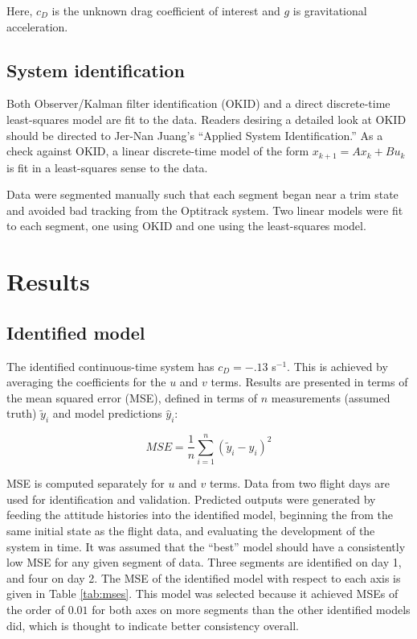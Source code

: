 \documentclass{aiaa-tc}
\begin{document}
Here, $c_D$ is the unknown drag coefficient of interest and $g$ is gravitational acceleration.

\subsection{System identification}

Both Observer/Kalman filter identification (OKID) and a direct discrete-time least-squares model are fit to the data. Readers desiring a detailed look at OKID should be directed to Jer-Nan Juang's ``Applied System Identification.'' As a check against OKID, a linear discrete-time model of the form $x_{k+1} = Ax_k + Bu_k$ is fit in a least-squares sense to the data.

Data were segmented manually such that each segment began near a trim state and avoided bad tracking from the Optitrack system. Two linear models were fit to each segment, one using OKID and one using the least-squares model.

\section{Results}

\subsection{Identified model}

The identified continuous-time system has $c_D = -.13$ s${}^{-1}$. This is achieved by averaging the coefficients for the $u$ and $v$ terms. Results are presented in terms of the mean squared error (MSE), defined in terms of $n$ measurements (assumed truth) $\tilde{y}_i$ and model predictions $\hat{y}_i$:

\begin{equation}
MSE = \frac{1}{n} \sum_{i=1}^n (\tilde{y}_i-\hat{y}_i)^2
\end{equation}

MSE is computed separately for $u$ and $v$ terms. Data from two flight days are used for identification and validation. Predicted outputs were generated by feeding the attitude histories into the identified model, beginning the from the same initial state as the flight data, and evaluating the development of the system in time. It was assumed that the ``best'' model should have a consistently low MSE for any given segment of data. Three segments are identified on day 1, and four on day 2. The MSE of the identified model with respect to each axis is given in Table \ref{tab:mses}. This model was selected because it achieved MSEs of the order of $0.01$ for both axes on more segments than the other identified models did, which is thought to indicate better consistency overall.
\end{document}
